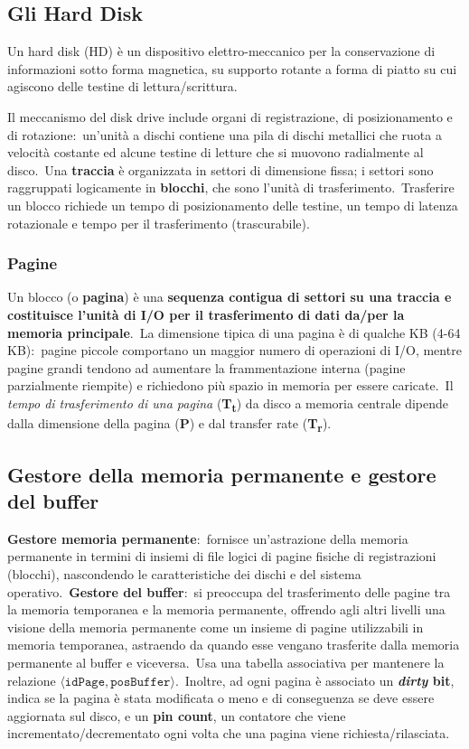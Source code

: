 \subsection{Gli Hard Disk}

Un hard disk (HD) è un dispositivo elettro-meccanico per la conservazione di informazioni sotto forma magnetica, su supporto rotante a forma di piatto su cui agiscono delle testine di lettura/scrittura.\

Il meccanismo del disk drive include organi di registrazione, di posizionamento e di rotazione:\ un'unità a dischi contiene una pila di dischi metallici che ruota a velocità costante ed alcune testine di letture che si muovono radialmente al disco.\
Una \textbf{traccia} è organizzata in settori di dimensione fissa; i settori sono raggruppati logicamente in \textbf{blocchi}, che sono l'unità di trasferimento.\
Trasferire un blocco richiede un tempo di posizionamento delle testine, un tempo di latenza rotazionale e tempo per il trasferimento (trascurabile).\

\subsubsection{Pagine}

Un blocco (o \textbf{pagina}) è una \textbf{sequenza contigua di settori su una traccia e costituisce l'unità di I/O per il trasferimento di dati da/per la memoria principale}.\
La dimensione tipica di una pagina è di qualche KB (4-64 KB):\ pagine piccole comportano un maggior numero di operazioni di I/O, mentre pagine grandi tendono ad aumentare la frammentazione interna (pagine parzialmente riempite) e richiedono più spazio in memoria per essere caricate.\
Il \textit{tempo di trasferimento di una pagina} (\textbf{T\textsubscript{t}}) da disco a memoria centrale dipende dalla dimensione della pagina (\textbf{P}) e dal transfer rate (\textbf{T\textsubscript{r}}).

\subsection{Gestore della memoria permanente e gestore del buffer}

\textbf{Gestore memoria permanente}:\ fornisce un'astrazione della memoria permanente in termini di insiemi di file logici di pagine fisiche di registrazioni (blocchi), nascondendo le caratteristiche dei dischi e del sistema operativo.\
\textbf{Gestore del buffer}:\ si preoccupa del trasferimento delle pagine tra la memoria temporanea e la memoria permanente, offrendo agli altri livelli una visione della memoria permanente come un insieme di pagine utilizzabili in memoria temporanea, astraendo da quando esse vengano trasferite dalla memoria permanente al buffer e viceversa.\
Usa una tabella associativa per mantenere la relazione $\langle \mathtt{idPage, posBuffer}\rangle$.\
Inoltre, ad ogni pagina è associato un \textbf{\textit{dirty} bit}, indica se la pagina è stata modificata o meno e di conseguenza se deve essere aggiornata sul disco, e un \textbf{pin count}, un contatore che viene incrementato/decrementato ogni volta che una pagina viene richiesta/rilasciata.\

